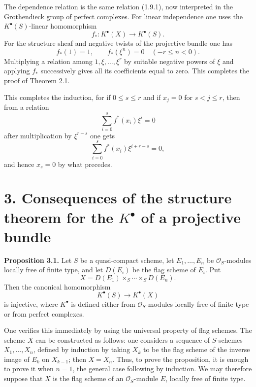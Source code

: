 The dependence relation is the same relation (1.9.1), now interpreted in the Grothendieck group of perfect complexes. For linear independence one uses the \(K^\bullet(S)\)-linear homomorphism
\[
  f_*:K^\bullet(X)\longrightarrow K^\bullet(S).
\]
For the structure sheaf and negative twists of the projective bundle one has
\[
  f_*(1)=1,\qquad f_*(\xi^n)=0\quad(-r\leq n<0).
\]
Multiplying a relation among \(1,\xi,\ldots,\xi^r\) by suitable negative powers of \(\xi\) and applying \(f_*\) successively gives all its coefficients equal to zero. This completes the proof of Theorem 2.1.



\providecommand{\Sym}{\operatorname{Sym}}
\providecommand{\GL}{\operatorname{GL}}
\providecommand{\Grass}{\operatorname{Grass}}
\providecommand{\gr}{\operatorname{gr}}
\providecommand{\ctop}{c_{\mathrm{top}}}
\providecommand{\Rep}{\operatorname{Rep}}
\providecommand{\RZ}{R_{\mathbb Z}}
\providecommand{\Dflag}{D}
\providecommand{\Gmn}{G}


This completes the induction, for if \(0\le s\le r\) and if \(x_j=0\) for \(s<j\le r\), then from a relation
\[
  \sum_{i=0}^{s} f^*(x_i)\xi^i=0
\]
after multiplication by \(\xi^{r-s}\) one gets
\[
  \sum_{i=0}^{s} f^*(x_i)\xi^{i+r-s}=0,
\]
and hence \(x_s=0\) by what precedes.

\section*{3. Consequences of the structure theorem for the \(K^\bullet\) of a projective bundle}

\textbf{Proposition 3.1.} Let \(S\) be a quasi-compact scheme, let \(E_1,\ldots,E_n\) be \(\mathcal O_S\)-modules locally free of finite type, and let \(D(E_i)\) be the flag scheme of \(E_i\). Put
\[
  X=D(E_1)\times_S\cdots\times_S D(E_n).
\]
Then the canonical homomorphism
\[
  K^\bullet(S)\longrightarrow K^\bullet(X)
\]
is injective, where \(K^\bullet\) is defined either from \(\mathcal O_S\)-modules locally free of finite type or from perfect complexes.

One verifies this immediately by using the universal property of flag schemes. The scheme \(X\) can be constructed as follows: one considers a sequence of \(S\)-schemes \(X_1,\ldots,X_n\), defined by induction by taking \(X_k\) to be the flag scheme of the inverse image of \(E_k\) on \(X_{k-1}\); then \(X=X_n\). Thus, to prove the proposition, it is enough to prove it when \(n=1\), the general case following by induction. We may therefore suppose that \(X\) is the flag scheme of an \(\mathcal O_S\)-module \(E\), locally free of finite type.

